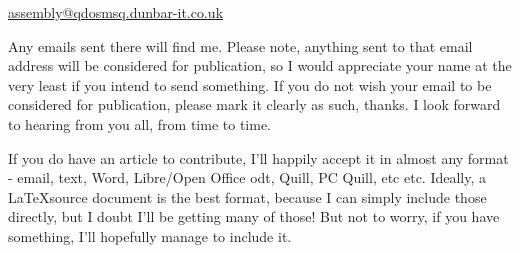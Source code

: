 \url{assembly@qdosmsq.dunbar-it.co.uk}

Any emails sent there will find me. Please note, anything sent to that email address will be considered for publication, so I would appreciate your name at the very least if you intend to send something. If you do not wish your email to be considered for publication, please mark it clearly as such, thanks. I look forward to hearing from you all, from time to time.

If you do have an article to contribute, I'll happily accept it in almost any format - email, text, Word, Libre/Open Office odt, Quill, PC Quill, etc etc. Ideally, a \LaTeX source document is the best format, because I
can simply include those directly, but I doubt I'll be getting many of those! But not to worry, if you have something, I'll hopefully manage to include it.

